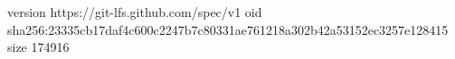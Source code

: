 version https://git-lfs.github.com/spec/v1
oid sha256:23335cb17daf4c600c2247b7c80331ae761218a302b42a53152ec3257e128415
size 174916
